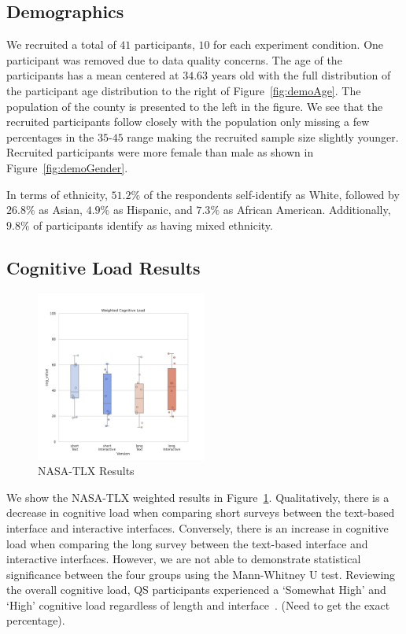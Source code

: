 
\subsection{Demographics}
We recruited a total of $41$ participants, $10$ for each experiment condition. One participant was removed due to data quality concerns. The age of the participants has a mean centered at $34.63$ years old with the full distribution of the participant age distribution to the right of Figure~\ref{fig:demoAge}. The population of the county is presented to the left in the figure. We see that the recruited participants follow closely with the population only missing a few percentages in the $35$-$45$ range making the recruited sample size slightly younger. Recruited participants were more female than male as shown in Figure~\ref{fig:demoGender}.

In terms of ethnicity, $51.2\%$ of the respondents self-identify as White, followed by $26.8\%$ as Asian, $4.9\%$ as Hispanic, and $7.3\%$ as African American. Additionally, $9.8\%$ of participants identify as having mixed ethnicity.

\subsection{Cognitive Load Results}

\begin{figure}[h]
    \centering
    \includegraphics[width=0.5\textwidth]{content/image/results/nasatlx_final_value.pdf}
    \caption{NASA-TLX Results}
    \label{fig:nasatlx-final}
\end{figure}

We show the NASA-TLX weighted results in Figure~\ref{fig:nasatlx-final}. Qualitatively, there is a decrease in cognitive load when comparing short surveys between the text-based interface and interactive interfaces. Conversely, there is an increase in cognitive load when comparing the long survey between the text-based interface and interactive interfaces. However, we are not able to demonstrate statistical significance between the four groups using the Mann-Whitney U test. Reviewing the overall cognitive load, QS participants experienced a `Somewhat High' and `High' cognitive load regardless of length and interface~\cite{hart1988development}. (Need to get the exact percentage).

